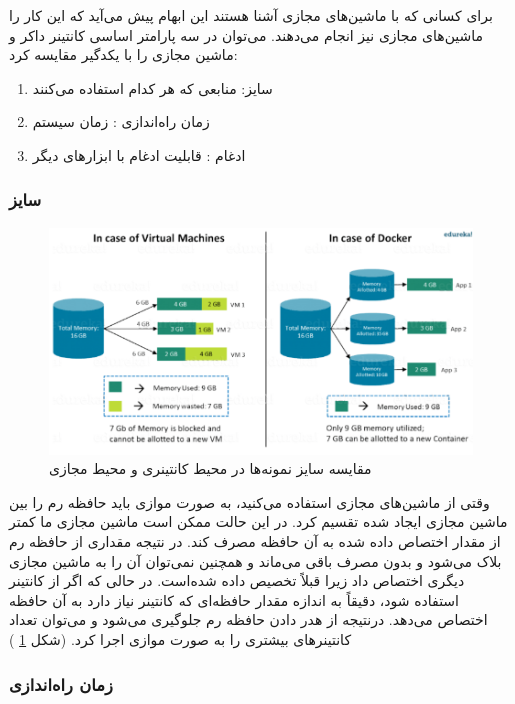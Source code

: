 برای کسانی که با ماشین‌های مجازی آشنا هستند این ابهام پیش می‌آید که این کار را ماشین‌های مجازی نیز انجام می‌دهند.  می‌توان در سه پارامتر اساسی کانتینر داکر و ماشین مجازی را با یکدگیر مقایسه کرد:
\cite{Edureka_DiveIntoDocker}

\begin{enumerate}
	\item 
	سایز: منابعی که هر کدام استفاده می‌کنند
	\item 
	زمان راه‌اندازی : زمان
	سیستم 
	\item 
	ادغام : قابلیت ادغام با ابزارهای دیگر
\end{enumerate}

\subsubsection*{سایز}


\begin{figure}[!h]
	\centering
	\includegraphics[width=\linewidth]{fig2-2}
	\caption{مقایسه سایز نمونه‌ها در محیط کانتینری و محیط مجازی}
	\label{تصویر 2-2}
\end{figure}

وقتی از ماشین‌های مجازی استفاده می‌کنید، به صورت موازی باید حافظه رم را بین ماشین مجازی ایجاد شده تقسیم کرد. در این حالت ممکن است ماشین مجازی ما کمتر از مقدار اختصاص داده شده به آن حافظه مصرف کند. در نتیجه مقداری از حافظه رم بلاک می‌شود و بدون مصرف باقی می‌ماند و همچنین نمی‌توان آن را به ماشین مجازی دیگری اختصاص داد زیرا قبلاً تخصیص داده شده‌است. در حالی که اگر از کانتینر استفاده شود،
دقیقاً به اندازه مقدار حافظه‌ای که کانتینر نیاز دارد به آن حافظه اختصاص می‌دهد. درنتیجه از هدر دادن حافظه رم جلوگیری می‌شود و می‌توان تعداد کانتینرهای بیشتری را به صورت موازی اجرا کرد. (‌شکل 
\ref{تصویر 2-2}
)

\subsubsection*{زمان راه‌اندازی}

